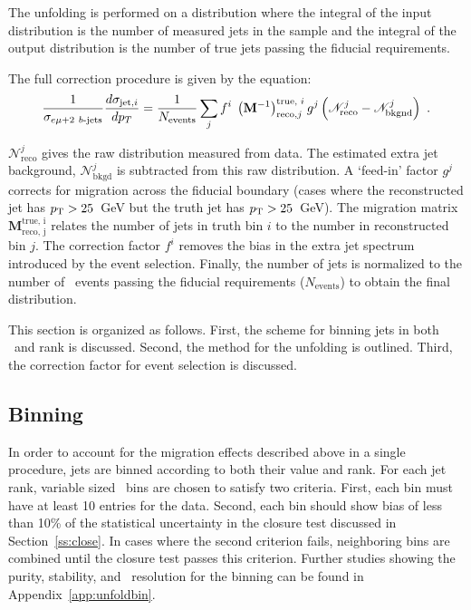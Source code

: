 The unfolding is performed on a distribution where the integral of the input distribution is the
number of measured jets in the sample and the integral of the output distribution is the number
of true jets passing the fiducial requirements. 

The full correction procedure is given by the equation:
\begin{equation}
\frac{1}{\sigma_{e\mu+2~b\textrm{-jets}}} \frac{d \sigma_{\mathrm{jet,}i}}{dp_T} = \frac{1}{N_{\textrm{events}}}\sum_j f^i \;\left ({\mathbf M}^{-1}\right )_{\textrm{reco,} j}^{\textrm{true, }i} g^j \left ({\mathscr N}^j_{\textrm {reco}}-
{\mathscr N}^j_{\textrm{bkgnd}} \right ) \ .
\label{eqn:unffinal}
\end{equation}
\noindent  

${\mathscr N}^j_{\textrm {reco}}$ gives the raw distribution measured from data. The estimated extra jet background, ${\mathscr N}^j_{\textrm{bkgd}}$ is subtracted from this raw distribution. 
A `feed-in' factor $g^j$ corrects for migration across the fiducial boundary (cases where the reconstructed jet has
$p_{\text{T}}>25$~GeV but the truth jet has $p_{\text{T}}>25$~GeV). The migration matrix ${\mathbf M}_{\textrm{reco, j}}^{\textrm{true, i}}$ 
relates the number of jets in truth bin $i$ to the number in reconstructed bin $j$. The correction factor $f^i$ 
removes the bias in the extra jet spectrum introduced by the event selection. Finally, the number of jets is normalized to the number of \emubb\ events passing the fiducial requirements ($N_{\textrm{events}}$) to obtain the final distribution.

This section is organized as follows.
First, the scheme for binning jets in both \pt\ and rank is discussed. 
Second, the method for the unfolding is outlined. Third, the correction factor for event selection is discussed.

\subsection{Binning}

In order to account for the migration effects described above in a single procedure, jets are binned according to both their \pt value and rank. 
For each jet rank, variable sized \pt\ bins are chosen to satisfy two criteria.
First, each bin must have at least 10 entries for the data. Second, each bin should show bias of less than 10\% of the statistical uncertainty in the closure test discussed in Section~\ref{ss:close}. In cases where the second criterion fails, neighboring bins are combined until the closure test passes this criterion. Further studies showing the purity, stability, and \pt\ resolution for the binning can be found in Appendix~\ref{app:unfoldbin}.


